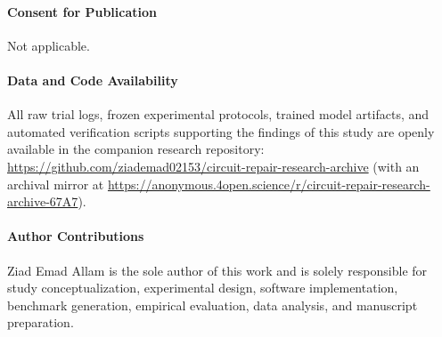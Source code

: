 \documentclass[11pt,a4paper]{article}
\begin{document}
\paragraph{Consent for Publication}
Not applicable.

\paragraph{Data and Code Availability}
All raw trial logs, frozen experimental protocols, trained model artifacts, and automated verification scripts supporting the findings of this study are openly available in the companion research repository: \url{https://github.com/ziademad02153/circuit-repair-research-archive} (with an archival mirror at \url{https://anonymous.4open.science/r/circuit-repair-research-archive-67A7}).

\paragraph{Author Contributions}
Ziad Emad Allam is the sole author of this work and is solely responsible for study conceptualization, experimental design, software implementation, benchmark generation, empirical evaluation, data analysis, and manuscript preparation.
\end{document}
